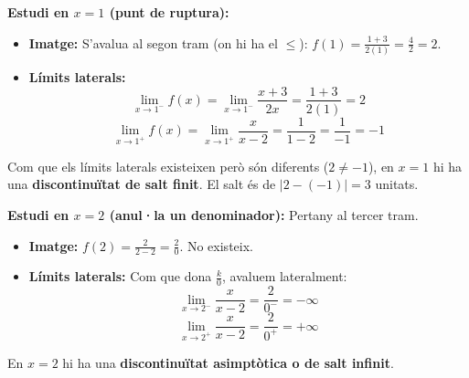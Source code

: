 \documentclass[12pt,a4paper]{article}
\begin{document}
\textbf{Estudi en $x = 1$ (punt de ruptura):}
\begin{itemize}
    \item \textbf{Imatge:} S'avalua al segon tram (on hi ha el $\le$): $f(1) = \frac{1+3}{2(1)} = \frac{4}{2} = 2$.
    \item \textbf{Límits laterals:}
    \[ \lim_{x \to 1^-} f(x) = \lim_{x \to 1^-} \frac{x+3}{2x} = \frac{1+3}{2(1)} = 2 \]
    \[ \lim_{x \to 1^+} f(x) = \lim_{x \to 1^+} \frac{x}{x-2} = \frac{1}{1-2} = \frac{1}{-1} = -1 \]
\end{itemize}
Com que els límits laterals existeixen però són diferents ($2 \neq -1$), en $x = 1$ hi ha una \textbf{discontinuïtat de salt finit}. El salt és de $|2 - (-1)| = 3$ unitats.

\textbf{Estudi en $x = 2$ (anul·la un denominador):}
Pertany al tercer tram.
\begin{itemize}
    \item \textbf{Imatge:} $f(2) = \frac{2}{2-2} = \frac{2}{0}$. No existeix.
    \item \textbf{Límits laterals:} Com que dona $\frac{k}{0}$, avaluem lateralment:
    \[ \lim_{x \to 2^-} \frac{x}{x-2} = \frac{2}{0^-} = -\infty \]
    \[ \lim_{x \to 2^+} \frac{x}{x-2} = \frac{2}{0^+} = +\infty \]
\end{itemize}
En $x = 2$ hi ha una \textbf{discontinuïtat asimptòtica o de salt infinit}.
\end{document}
